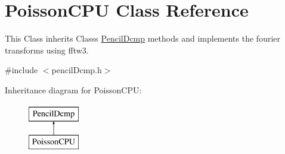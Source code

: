 \hypertarget{classPoissonCPU}{}\section{Poisson\+C\+PU Class Reference}
\label{classPoissonCPU}


This Class inherits Classs \mbox{\hyperlink{classPencilDcmp}{Pencil\+Dcmp}} methods and implements the fourier transforms using fftw3.  




{\ttfamily \#include $<$pencil\+Dcmp.\+h$>$}

Inheritance diagram for Poisson\+C\+PU\+:\begin{figure}[H]
\begin{center}
\leavevmode
\includegraphics[height=2.000000cm]{classPoissonCPU}
\end{center}
\end{figure}
